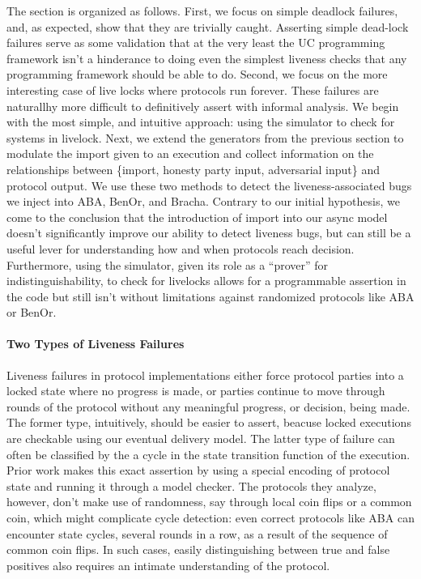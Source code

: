 The section is organized as follows.  First, we focus on simple deadlock
failures, and, as expected, show that they are trivially caught.  Asserting
simple dead-lock failures serve as some validation that at the very least the
UC programming framework isn't a hinderance to doing even the simplest liveness
checks that any programming framework should be able to do.  Second, we focus
on the more interesting case of live locks where protocols run forever.  These
failures are naturallhy more difficult to definitively assert with informal
analysis.  We begin with the most simple, and intuitive approach: using the
simulator to check for systems in livelock.  Next, we extend the generators
from the previous section to modulate the import given to an execution and
collect information on the relationships between \{import, honesty party input,
adversarial input\} and protocol output.  We use these two methods to detect
the liveness-associated bugs we inject into ABA, BenOr, and Bracha.  Contrary
to our initial hypothesis, we come to the conclusion that the introduction of
import into our async model doesn't significantly improve our ability to detect
liveness bugs, but can still be a useful lever for understanding how and when
protocols reach decision.  Furthermore, using the simulator, given its role as
a ``prover'' for indistinguishability, to check for livelocks allows for a
programmable assertion in the code but still isn't without limitations against
randomized protocols like ABA or BenOr.

\paragraph{Two Types of Liveness Failures}
Liveness failures in protocol implementations either force protocol parties
into a locked state where no progress is made, or parties continue to move
through rounds of the protocol without any meaningful progress, or decision,
being made.  The former type, intuitively, should be easier to assert, beacuse
locked executions are checkable using our eventual delivery model.  The latter
type of failure can often be classified by the a cycle in the state transition
function of the execution.  Prior work \cite{formalbyzantine} makes this exact
assertion by using a special encoding of protocol state and running it through
a model checker.  The protocols they analyze, however, don't make use of
randomness, say through local coin flips or a common coin, which might
complicate cycle detection: even correct protocols like ABA can encounter state
cycles, several rounds in a row, as a result of the sequence of common coin
flips.  In such cases, easily distinguishing between true and false positives
also requires an intimate understanding of the protocol.

